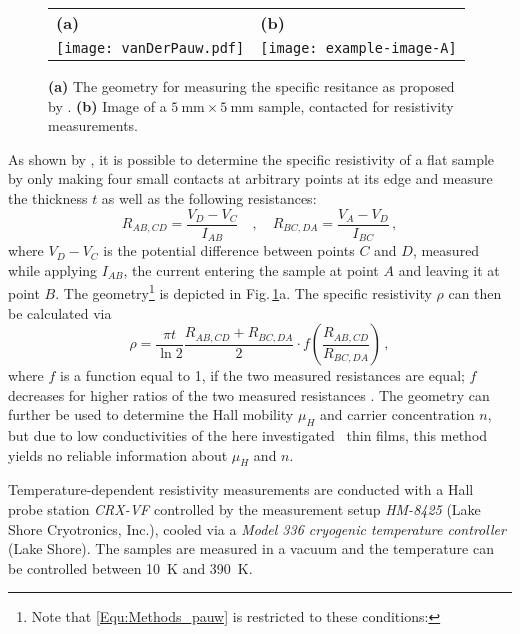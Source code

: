 \begin{figure}
    \centering
    \begin{tabular}{ll}
        \textbf{(a)} & \textbf{(b)} \\
        \texttt{[image: vanDerPauw.pdf]}
        & \texttt{[image: example-image-A]}
    \end{tabular}
    \caption{\textbf{(a)} The geometry for measuring the specific resitance as proposed by \textcite{pauw1958}. \textbf{(b)} Image of a $\qty{5}{\mm}\times\qty{5}{\mm}$ sample, contacted for resistivity measurements. \tbd}
    \label{Fig:Methods_pauwGeometry}
\end{figure}

As shown by \textcite{pauw1958}, it is possible to determine the specific resistivity of a flat sample by only making four small contacts at arbitrary points at its edge and measure the thickness $t$ as well as the following resistances:
\begin{equation}
    R_{AB,CD}=\frac{V_D-V_C}{I_{AB}}\quad , \quad
    R_{BC,DA}=\frac{V_A-V_D}{I_{BC}}\,,
\end{equation}
where $V_D-V_C$ is the potential difference between points $C$ and $D$, measured while applying $I_{AB}$, the current entering the sample at point $A$ and leaving it at point $B$.
The geometry\footnote{
    Note that \eqref{Equ:Methods_pauw} is restricted to these conditions:
} is depicted in Fig.\,\ref{Fig:Methods_pauwGeometry}a.
The specific resistivity $\rho$ can then be calculated via
\begin{equation}
    \label{Equ:Methods_pauw}
    \rho=
    \frac{\pi t}{\ln2}
    \frac{R_{AB,CD}+R_{BC,DA}}{2}
    \cdot f\left(\frac{R_{AB,CD}}{R_{BC,DA}}\right)\,,
\end{equation}
where $f$ is a function equal to 1, if the two measured resistances are equal; $f$ decreases for higher ratios of the two measured resistances
    \cite{pauw1958}.
The geometry can further be used to determine the Hall mobility $\mu_H$ and carrier concentration $n$, but due to low conductivities of the here investigated \cro\ thin films, this method yields no reliable information about $\mu_H$ and $n$.

Temperature-dependent resistivity measurements are conducted with a Hall probe station \textit{CRX-VF} controlled by the measurement setup \textit{HM-8425} (Lake Shore Cryotronics, Inc.), cooled via a \textit{Model 336 cryogenic temperature controller} (Lake Shore).
The samples are measured in a vacuum and the temperature can be controlled between \qty{10}{\kelvin} and \qty{390}{\kelvin}.